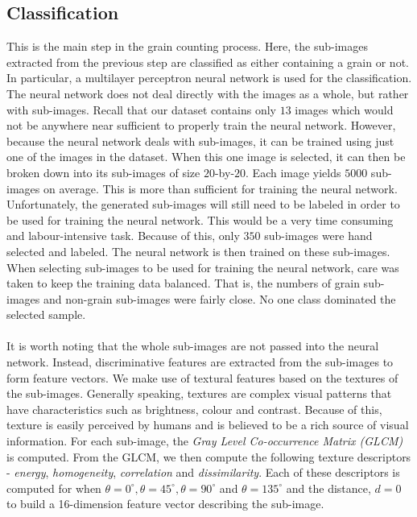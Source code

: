 \subsection{Classification}
This is the main step in the grain counting process. Here, the sub-images extracted from the previous step are classified as either containing a grain or not. In particular, a multilayer perceptron neural network is used for the classification. The neural network does not deal directly with the images as a whole, but rather with sub-images. Recall that our dataset contains only $13$ images which would not be anywhere near sufficient to properly train the neural network. However, because the neural network deals with sub-images, it can be trained using just one of the images in the dataset. When this one image is selected, it can then be broken down into its sub-images of size $20$-by-$20$. Each image yields $5000$ sub-images on average. This is more than sufficient for training the neural network. Unfortunately, the generated sub-images will still need to be labeled in order to be used for training the neural network. This would be a very time consuming and labour-intensive task. Because of this, only $350$ sub-images were hand selected and labeled. The neural network is then trained on these sub-images. When selecting sub-images to be used for training the neural network, care was taken to keep the training data balanced. That is, the numbers of grain sub-images and non-grain sub-images were fairly close. No one class dominated the selected sample.\\ \\
%
It is worth noting that the whole sub-images are not passed into the neural network. Instead, discriminative features are extracted from the sub-images to form feature vectors. We make use of textural features based on the textures of the sub-images. Generally speaking, textures are complex visual patterns that have characteristics such as brightness, colour and contrast. Because of this, texture is easily perceived by humans and is believed to be a rich source of
visual information. For each sub-image, the \textit{Gray Level Co-occurrence Matrix (GLCM)} is computed. From the GLCM, we then compute the following texture descriptors - \textit{energy}, \textit{homogeneity}, \textit{correlation} and \textit{dissimilarity}. Each of these descriptors is computed for when $\theta = 0^\circ, \theta = 45^\circ, \theta = 90^\circ$ and $\theta = 135^\circ$ and the distance, $d = 0$ to build a 16-dimension feature vector describing the sub-image.
